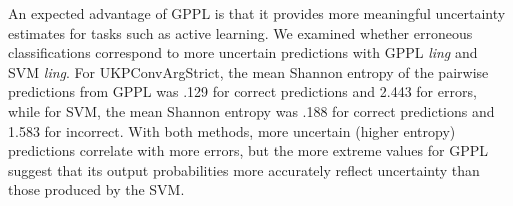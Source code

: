 % 


An expected advantage of GPPL is that it provides more meaningful uncertainty estimates for tasks such as active learning. 
We examined whether erroneous classifications correspond to more uncertain predictions
with GPPL \emph{ling} and SVM \emph{ling}.
For UKPConvArgStrict, the mean Shannon entropy
of the pairwise predictions from GPPL 
was .129 for correct predictions and 2.443 for errors,
while for SVM, the mean Shannon entropy was  .188 for correct predictions and 
1.583 for incorrect.
With both methods, more uncertain (higher entropy) predictions correlate with more errors,
but the more extreme values for GPPL suggest that its output probabilities more 
accurately reflect uncertainty than those produced by the SVM.

